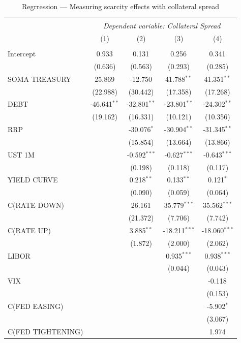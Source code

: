 \documentclass[11pt,a4paper,english,oneside]{article}
\begin{document}
\begin{table}[!htbp] \centering
\caption{Regrression --- Measuring scarcity effects with collateral spread}
\begin{tabular}{@{\extracolsep{5pt}}lcccc}
\\[-1.8ex]\hline
\hline \\[-1.8ex]
& \multicolumn{4}{c}{\textit{Dependent variable: Collateral Spread}} \
\cr \cline{4-5}
\\[-1.8ex] & (1) & (2) & (3) & (4) \\
\hline \\[-1.8ex]
 Intercept & 0.933$^{}$ & 0.131$^{}$ & 0.256$^{}$ & 0.341$^{}$ \\
  & (0.636) & (0.563) & (0.293) & (0.285) \\
 SOMA TREASURY & 25.869$^{}$ & -12.750$^{}$ & 41.788$^{**}$ & 41.351$^{**}$ \\
  & (22.988) & (30.442) & (17.358) & (17.268) \\
 DEBT & -46.641$^{**}$ & -32.801$^{**}$ & -23.801$^{**}$ & -24.302$^{**}$ \\
  & (19.162) & (16.331) & (10.121) & (10.356) \\
 RRP & & -30.076$^{*}$ & -30.904$^{**}$ & -31.345$^{**}$ \\
  & & (15.854) & (13.664) & (13.866) \\
 UST 1M & & -0.592$^{***}$ & -0.627$^{***}$ & -0.643$^{***}$ \\
  & & (0.198) & (0.118) & (0.117) \\
 YIELD CURVE & & 0.218$^{**}$ & 0.133$^{**}$ & 0.121$^{*}$ \\
  & & (0.090) & (0.059) & (0.064) \\
 C(RATE DOWN) & & 26.161$^{}$ & 35.779$^{***}$ & 35.562$^{***}$ \\
  & & (21.372) & (7.706) & (7.742) \\
 C(RATE UP) & & 3.885$^{**}$ & -18.211$^{***}$ & -18.060$^{***}$ \\
  & & (1.872) & (2.000) & (2.062) \\
 LIBOR & & & 0.935$^{***}$ & 0.938$^{***}$ \\
  & & & (0.044) & (0.043) \\
 VIX & & & & -0.118$^{}$ \\
  & & & & (0.153) \\
 C(FED EASING) & & & & -5.902$^{*}$ \\
  & & & & (3.067) \\
 C(FED TIGHTENING) & & & & 1.974$^{}$ \\

\end{tabular}
\end{table}
\end{document}
